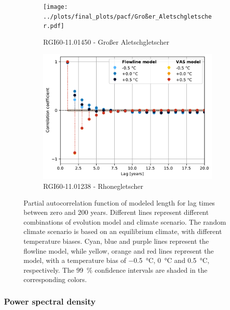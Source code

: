 \begin{figure}[htp]
        \begin{subfigure}[b]{0.48\textwidth}
          \caption{RGI60-11.01450 - Großer Aletschgletscher}
          \label{fig:pacf:großer_aletschgletscher}
          \centering
          \texttt{[image: ../plots/final\_plots/pacf/Großer\_Aletschgletscher.pdf]}
        \end{subfigure}
        \hfill
        \begin{subfigure}[b]{0.48\textwidth}
          \caption{RGI60-11.01238 - Rhonegletscher}
          \label{fig:pacf:rhonegletscher}
          \centering
          \includegraphics[width=\textwidth]{../plots/final_plots/pacf/Rhonegletscher.pdf}
        \end{subfigure}

        \caption{Partial autocorrelation function of modeled length for lag times between zero and 200 years. Different lines represent different combinations of evolution model and climate scenario.
        The random climate scenario is based on an equilibrium climate, with different temperature biases.
        Cyan, blue and purple lines represent the flowline model, while yellow, orange and red lines represent the \vas{} model, with a temperature bias of \SI{-.5}{\celsius}, \SI{0}{\celsius} and \SI{+.5}{\celsius}, respectively.
        The \SI{99}{\percent} confidence intervals are shaded in the corresponding colors.}
        \label{fig:pacf}
      \end{figure}


    \subsubsection{Power spectral density} %
    \label{ssub:power_spectral_density_results}
    
